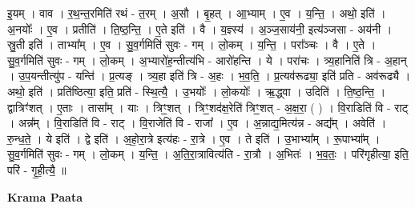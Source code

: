 \documentclass[17pt]{extarticle}
\begin{document}
इ॒यम् । वाव । र॒थ॒न्त॒रमिति॑ रथं - त॒रम् । अ॒सौ । बृ॒हत् । आ॒भ्याम् । ए॒व । य॒न्ति॒ । अथो॒ इति॑ । अ॒नयोः᳚ । ए॒व । प्रतीति॑ । ति॒ष्ठ॒न्ति॒ । ए॒ते इति॑ । वै । य॒ज्ञ्स्य॑ । अ॒ञ्ज॒साय॑नी॒ इत्य॑ञ्जसा - अय॑नी । स्रु॒ती इति॑ । ताभ्या᳚म् । ए॒व । सु॒व॒र्गमिति॑ सुवः - गम् । लो॒कम् । य॒न्ति॒ । परा᳚ञ्चः । वै । ए॒ते । सु॒व॒र्गमिति॑ सुवः - गम् । लो॒कम् । अ॒भ्यारो॑ह॒न्तीत्य॑भि - आरो॑हन्ति । ये । परा॑चः । त्र्य॒हानिति॑ त्रि - अ॒हान् । उ॒प॒यन्तीत्यु॑प - यन्ति॑ । प्र॒त्यङ् । त्र्य॒हा इति॑ त्रि - अ॒हः । भ॒व॒ति॒ । प्र॒त्यव॑रूढ्या॒ इति॑ प्रति - अव॑रूढ्यै । अथो॒ इति॑ । प्रति॑ष्ठित्या॒ इति॒ प्रति॑ - स्थि॒त्यै॒ । उ॒भयोः᳚ । लो॒कयोः᳚ । ऋ॒द्ध्वा । उदिति॑ । ति॒ष्ठ॒न्ति॒ । द्वात्रिꣳ॑शत् । ए॒ताः । तासा᳚म् । याः । त्रिꣳ॒॒शत् । त्रिꣳ॒॒शद॑क्ष॒रेति॑ त्रिꣳ॒॒शत् - अ॒क्ष॒रा॒ ( ) । वि॒राडिति॑ वि - राट् । अन्न᳚म् । वि॒राडिति॑ वि - राट् । वि॒राजेति॑ वि - राजा᳚ । ए॒व । अ॒न्नाद्य॒मित्य॑न्न - अद्य᳚म् । अवेति॑ । रु॒न्ध॒ते॒ । ये इति॑ । द्वे इति॑ । अ॒हो॒रा॒त्रे इत्य॑हः - रा॒त्रे । ए॒व । ते इति॑ । उ॒भाभ्या᳚म् । रू॒पाभ्या᳚म् । सु॒व॒र्गमिति॑ सुवः - गम् । लो॒कम् । य॒न्ति॒ । अ॒ति॒रा॒त्रावित्य॑ति - रा॒त्रौ । अ॒भितः॑ । भ॒व॒तः॒ । परि॑गृहीत्या॒ इति॒ परि॑ - गृ॒ही॒त्यै॒ ॥  \newline


\textbf{Krama Paata} \newline
\end{document}
